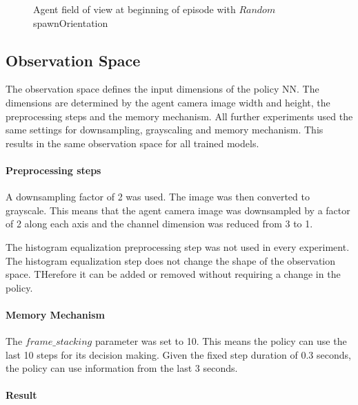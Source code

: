 \begin{figure}
    \centering
    \qquad
    \qquad
    \qquad
    \caption{Agent field of view at beginning of episode with $Random$ spawnOrientation}
    \label{fig:agent_field_of_view}
\end{figure}


\subsection{Observation Space}

The observation space defines the input dimensions of the policy \ac{NN}. The dimensions are determined by the agent camera image width and height, the preprocessing steps and the memory mechanism. All further experiments used the same settings for downsampling, grayscaling and memory mechanism. This results in the same observation space for all trained models.

\paragraph{Preprocessing steps}
A downsampling factor of 2 was used. The image was then converted to grayscale. This means that the agent camera image was downsampled by a factor of 2 along each axis and the channel dimension was reduced from 3 to 1.

The histogram equalization preprocessing step was not used in every experiment. The histogram equalization step does not change the shape of the observation space. THerefore it can be added or removed without requiring a change in the policy.

\paragraph{Memory Mechanism}
The $frame\_stacking$ parameter was set to 10. This means the policy can use the last 10 steps for its decision making. Given the fixed step duration of 0.3 seconds, the policy can use information from the last 3 seconds.

\paragraph{Result}

